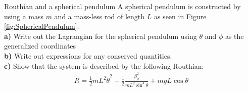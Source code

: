 \begin{problem}{Routhian and a spherical pendulum}
A spherical pendulum is constructed by using a mass $m$ and a mass-less rod of length $L$ as seen in Figure \ref{fig:SphericalPendulum}.
\\
\textbf{a)} Write out the Lagrangian for the spherical pendulum using $\theta$ and $\phi$ as the generalized coordinates\\
\textbf{b)} Write out expressions for any conserved quantities.\\
\textbf{c)} Show that the system is described by the following Routhian:
\begin{align*}
R = \frac{1}{2}mL^2\dot\theta^2-\frac{1}{2}\frac{\beta_\phi^2}{mL^2\sin^2\theta}+mgL\cos\theta
\end{align*}
\\
\label{prob_Lagrange_12}
\end{problem}


